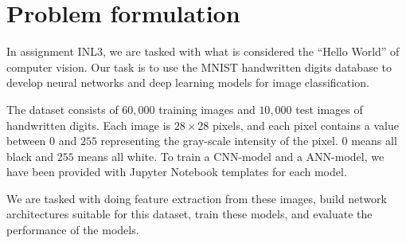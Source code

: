 \section{Problem formulation}

In assignment INL3, we are tasked with what is considered the ``Hello World'' of computer vision. Our task is to use the MNIST handwritten digits database to develop neural networks and deep learning models for image classification. 
\par
The dataset consists of $60,000$ training images and $10,000$ test images of handwritten digits. Each image is $28 \times 28$ pixels, and each pixel contains a value between $0$ and $255$ representing the gray-scale intensity of the pixel. $0$ means all black and $255$ means all white. To train a CNN-model and a ANN-model, we have been provided with Jupyter Notebook templates for each model. 
\par
We are tasked with doing feature extraction from these images, build network architectures suitable for this dataset, train these models, and evaluate the performance of the models.  